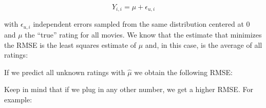 \documentclass[
]{article}
\newenvironment{Shaded}{}{}
\newcommand{\DecValTok}[1]{\textcolor[rgb]{0.25,0.63,0.44}{#1}}
\newcommand{\FloatTok}[1]{\textcolor[rgb]{0.25,0.63,0.44}{#1}}
\newcommand{\FunctionTok}[1]{\textcolor[rgb]{0.02,0.16,0.49}{#1}}
\newcommand{\NormalTok}[1]{#1}
\newcommand{\OtherTok}[1]{\textcolor[rgb]{0.00,0.44,0.13}{#1}}
\newcommand{\SpecialCharTok}[1]{\textcolor[rgb]{0.25,0.44,0.63}{#1}}
\begin{document}
\label{eq:EqModel1} \begin{equation}
  Y_{i,i} = \mu + \epsilon_{u,i}
\end{equation}

with \(\epsilon_{u,i}\) independent errors sampled from the same
distribution centered at 0 and \(\mu\) the ``true'' rating for all
movies. We know that the estimate that minimizes the RMSE is the least
squares estimate of \(\mu\) and, in this case, is the average of all
ratings:

\begin{Shaded}
\end{Shaded}

If we predict all unknown ratings with \(\hat\mu\) we obtain the
following RMSE:

\begin{Shaded}
\end{Shaded}

Keep in mind that if we plug in any other number, we get a higher RMSE.
For example:

\begin{Shaded}
\end{Shaded}
\end{document}
